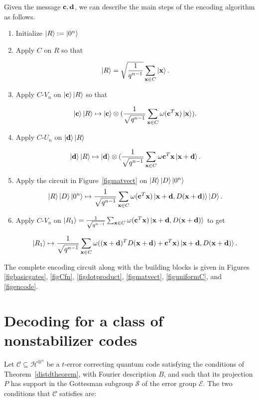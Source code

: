\documentclass{Rinton-P9x6}
\newcommand {\ket} [1] {\ensuremath \left\vert#1\ensuremath \right\rangle}
\renewcommand{\c}{{\bf c}}
\renewcommand{\d}{{\bf d}}
\newcommand{\x}{{\bf x}}
\newcommand{\C}{{\ensuremath{\mathcal{C}}}}
\renewcommand{\S}{{\ensuremath{\mathcal{S}}}}
\newcommand{\Hin}{{\ensuremath{\mathcal{H}^{\otimes^n}}}}
\newcommand{\E}{{\ensuremath{\mathcal{E}}}}
\begin{document}
Given the message $\c,\d$, we can describe the main steps of the
encoding algorithm as follows.

\begin{enumerate}
\item Initialize $\ket{R} := \ket{0^n}$
\item Apply $C$ on $R$ so that
  
\[
  \ket{R} = \sqrt{\frac{1}{q^{n-1}}}\sum_{\x \in C}\ket{\x}.
\]
  
\item Apply $C$-$V_n$ on $\ket{\bf c}\ket{R}$ so that
    
\[
\ket{\bf c}\ket{R} \mapsto \ket{\bf c} \otimes (\frac{1}{\sqrt{q^{n-1}}}
\sum_{\x \in C} \omega({\bf c}^T \x ) \ket{\x}).
\]
  
\item Apply $C$-$U_n$ on $\ket{\d}\ket{R}$
    
\[
\ket{\d}\ket{R} \mapsto \ket{\d} \otimes ( \frac{1}{\sqrt{q^{n-1}}}
    \sum_{\x \in C}\omega{\c^T \x}\ket{\x + \d}.
\]
  
\item Apply the circuit in Figure~\ref{figmatvect} on
    $\ket{R}\ket{D}\ket{0^n}$ 
\[
\ket{R}\ket{D}\ket{0^n} \mapsto \frac{1}{\sqrt{q^{n-1}}}\sum_{\x \in
  C} \omega(\c^T \x) \ket{\x+\d,D(\x+\d)}\ket{D}.
\]
  
\item Apply $C$-$V_n$ on
    $\ket{R_1}=\frac{1}{\sqrt{q^{n-1}}}\sum_{\x \in C} \omega(\c^T \x)
    \ket{\x+\d,D(\x+\d)}$ to get
    
\[
\ket{R_1} \mapsto \frac{1}{\sqrt{q^{n-1}}}\sum_{\x \in C}
\omega((\x+\d)^TD(\x+\d) + \c^T \x) \ket{\x+\d,D(\x+\d)}.
\]
\end{enumerate}

The complete encoding circuit along with the building blocks is given
in Figures \ref{figbasicgates}, \ref{figCfn}, \ref{figdotproduct},
\ref{figmatvect}, \ref{figuniformC}, and \ref{figencode}.

\section{Decoding for a class of nonstabilizer codes}

Let $\C\subseteq\Hin$ be a $t$-error correcting quantum code
satisfying the conditions of Theorem~\ref{distdtheorem}, with Fourier
description $B$, and such that its projection $P$ has support in the
Gottesman subgroup $\S$ of the error group $\E$. The two conditions that
$\C$ satisfies are:
\end{document}
